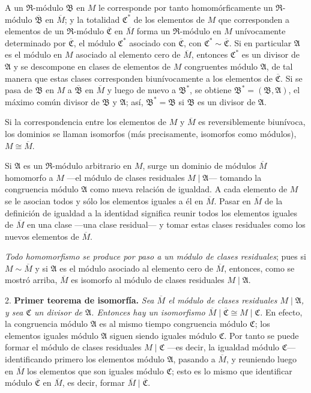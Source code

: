 \documentclass[11pt]{article}
\providecommand{\mR}{\mathfrak{R}}
\providecommand{\mA}{\mathfrak{A}}
\providecommand{\mB}{\mathfrak{B}}
\providecommand{\mC}{\mathfrak{C}}
\begin{document}
A un $\mR$-módulo $\mB$ en $M$ le corresponde por tanto homomórficamente un $\mR$-módulo $\overline{\mB}$ en $\overline M$; y la totalidad $\mC^*$ de los elementos de $M$ que corresponden a elementos de un $\mR$-módulo $\overline{\mC}$ en $\overline M$ forma un $\mR$-módulo en $M$ unívocamente determinado por $\overline{\mC}$, el módulo $\mC^*$ asociado con $\overline{\mC}$, con $\mC^*\sim\overline{\mC}$. Si en particular $\mA$ es el módulo en $M$ asociado al elemento cero de $\overline M$, entonces $\mC^*$ es un divisor de $\mA$ y se descompone en clases de elementos de $M$ congruentes módulo $\mA$, de tal manera que estas clases corresponden biunívocamente a los elementos de $\overline{\mC}$. Si se pasa de $\mB$ en $M$ a $\overline{\mB}$ en $\overline M$ y luego de nuevo a $\mB^*$, se obtiene $\mB^*=(\mB,\mA)$, el máximo común divisor de $\mB$ y $\mA$; así, $\mB^*=\mB$ si $\mB$ es un divisor de $\mA$.

Si la correspondencia entre los elementos de $M$ y $\overline M$ es reversiblemente biunívoca, los dominios se llaman isomorfos (más precisamente, isomorfos como módulos), $M\cong\overline M$.

Si $\mA$ es un $\mR$-módulo arbitrario en $M$, surge un dominio de módulos $\overline M$ homomorfo a $M$ ---el módulo de clases residuales $M\mid\mA$--- tomando la congruencia módulo $\mA$ como nueva relación de igualdad. A cada elemento de $M$ se le asocian todos y sólo los elementos iguales a él en $\overline M$. Pasar en $\overline M$ de la definición de igualdad a la identidad significa reunir todos los elementos iguales de $\overline M$ en una clase ---una clase residual--- y tomar estas clases residuales como los nuevos elementos de $\overline M$.

\emph{Todo homomorfismo se produce por paso a un módulo de clases residuales}; pues si $M\sim\overline M$ y si $\mA$ es el módulo asociado al elemento cero de $\overline M$, entonces, como se mostró arriba, $\overline M$ es isomorfo al módulo de clases residuales $M\mid\mA$.

2. \textbf{Primer teorema de isomorfía.} \emph{Sea $\overline M$ el módulo de clases residuales $M\mid\mA$, y sea $\mC$ un divisor de $\mA$. Entonces hay un isomorfismo $\overline M\mid\overline{\mC}\cong M\mid\mC$.} En efecto, la congruencia módulo $\mA$ es al mismo tiempo congruencia módulo $\mC$; los elementos iguales módulo $\mA$ siguen siendo iguales módulo $\mC$. Por tanto se puede formar el módulo de clases residuales $M\mid\mC$ ---es decir, la igualdad módulo $\mC$--- identificando primero los elementos módulo $\mA$, pasando a $\overline M$, y reuniendo luego en $\overline M$ los elementos que son iguales módulo $\mC$; esto es lo mismo que identificar módulo $\overline{\mC}$ en $\overline M$, es decir, formar $\overline M\mid\overline{\mC}$.
\end{document}
